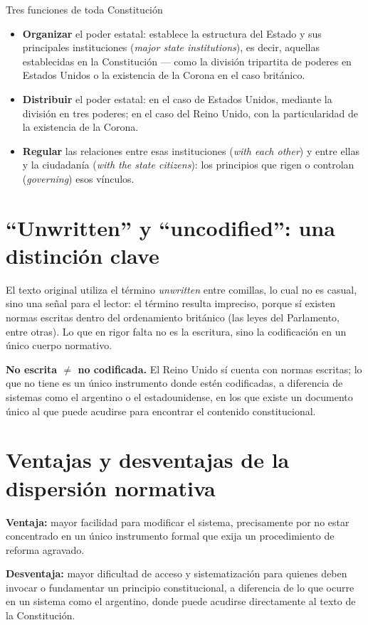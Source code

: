 \documentclass[12pt,oneside]{book}
\begin{document}
\begin{definition}{Tres funciones de toda Constitución}
\begin{itemize}
    \item \textbf{Organizar} el poder estatal: establece la estructura del Estado y sus principales instituciones (\emph{major state institutions}), es decir, aquellas establecidas en la Constitución --- como la división tripartita de poderes en Estados Unidos o la existencia de la Corona en el caso británico.
    \item \textbf{Distribuir} el poder estatal: en el caso de Estados Unidos, mediante la división en tres poderes; en el caso del Reino Unido, con la particularidad de la existencia de la Corona.
    \item \textbf{Regular} las relaciones entre esas instituciones (\emph{with each other}) y entre ellas y la ciudadanía (\emph{with the state citizens}): los principios que rigen o controlan (\emph{governing}) esos vínculos.
\end{itemize}
\end{definition}

\section{``Unwritten'' y ``uncodified'': una distinción clave}

El texto original utiliza el término \emph{unwritten} entre comillas, lo cual no es casual, sino una señal para el lector: el término resulta impreciso, porque sí existen normas escritas dentro del ordenamiento británico (las leyes del Parlamento, entre otras). Lo que en rigor falta no es la escritura, sino la codificación en un único cuerpo normativo.

\begin{important}
\textbf{No escrita $\neq$ no codificada.} El Reino Unido sí cuenta con normas escritas; lo que no tiene es un único instrumento donde estén codificadas, a diferencia de sistemas como el argentino o el estadounidense, en los que existe un documento único al que puede acudirse para encontrar el contenido constitucional.
\end{important}

\section{Ventajas y desventajas de la dispersión normativa}

\begin{note}
\textbf{Ventaja:} mayor facilidad para modificar el sistema, precisamente por no estar concentrado en un único instrumento formal que exija un procedimiento de reforma agravado.

\textbf{Desventaja:} mayor dificultad de acceso y sistematización para quienes deben invocar o fundamentar un principio constitucional, a diferencia de lo que ocurre en un sistema como el argentino, donde puede acudirse directamente al texto de la Constitución.
\end{note}
\end{document}
